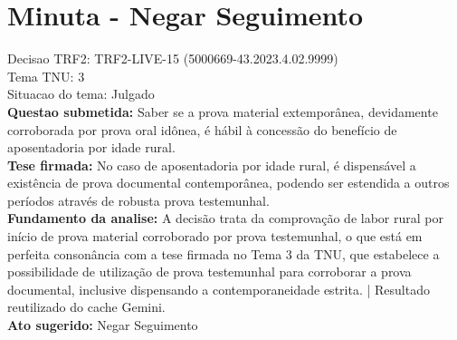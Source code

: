 \documentclass{article}
\begin{document}
\section*{Minuta - Negar Seguimento}
Decisao TRF2: TRF2-LIVE-15 (5000669-43.2023.4.02.9999)\\
Tema TNU: 3\\
Situacao do tema: Julgado\\
\textbf{Questao submetida:} Saber se a prova material extemporânea, devidamente corroborada por prova oral idônea, é hábil à concessão do benefício de aposentadoria por idade rural.\\
\textbf{Tese firmada:} No caso de aposentadoria por idade rural, é dispensável a existência de prova documental contemporânea, podendo ser estendida a outros períodos através de robusta prova testemunhal.\\
\textbf{Fundamento da analise:} A decisão trata da comprovação de labor rural por início de prova material corroborado por prova testemunhal, o que está em perfeita consonância com a tese firmada no Tema 3 da TNU, que estabelece a possibilidade de utilização de prova testemunhal para corroborar a prova documental, inclusive dispensando a contemporaneidade estrita. | Resultado reutilizado do cache Gemini.\\
\textbf{Ato sugerido:} Negar Seguimento
\end{document}
